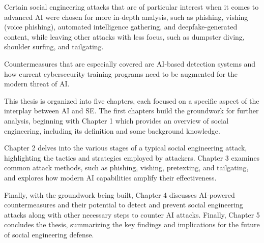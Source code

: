 Certain social engineering attacks that are of particular interest when it comes to advanced AI were chosen for more in-depth analysis, such as phishing, vishing (voice phishing), automated intelligence gathering, and deepfake-generated content, while leaving other attacks with less focus, such as dumpster diving, shoulder surfing, and tailgating.

Countermeasures that are especially covered are AI-based detection systems and how current cybersecurity training programs need to be augmented for the modern threat of AI.


This thesis is organized into five chapters, each focused on a specific aspect of the interplay between AI and SE. The first chapters build the groundwork for further analysis, beginning with Chapter 1 which provides an overview of social engineering, including its definition and some background knowledge.

Chapter 2 delves into the various stages of a typical social engineering attack, highlighting the tactics and strategies employed by attackers. Chapter 3 examines common attack methods, such as phishing, vishing, pretexting, and tailgating, and explores how modern AI capabilities amplify their effectiveness.

Finally, with the groundwork being built, Chapter 4 discusses AI-powered countermeasures and their potential to detect and prevent social engineering attacks along with other necessary steps to counter AI attacks. Finally, Chapter 5 concludes the thesis, summarizing the key findings and implications for the future of social engineering defense.




